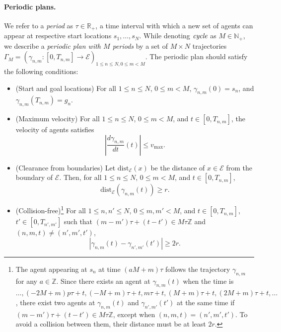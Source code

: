 \documentclass[letterpaper]{article} %
\begin{document}
\paragraph{Periodic plans.}
We refer to a \emph{period} as $\tau\in\mathbb{R}_+$, a time interval with which a new set of agents can appear at respective start locations $s_1,\dots,s_N$. While denoting $\emph{cycle}$ as $M\in\mathbb{N}_+$, we describe a \emph{periodic plan with $M$ periods} by a set of $M\times N$ trajectories $\Gamma_M=(\gamma_{n,m}: [0, T_{n,m}] \rightarrow \mathcal{E})_{1\leq n \leq N, 0\leq m < M}$. The periodic plan should satisfy the following conditions:
\begin{itemize}
\item (Start and goal locations) For all $1\leq n\leq N$, $0\leq m < M$,
 $\gamma_{n,m}(0) = s_n$, and $\gamma_{n,m}(T_{n,m}) = g_n$.
\item (Maximum velocity) For all $1\leq n\leq N$, $0\leq m<M$, and $t\in [0, T_{n,m}]$, the velocity of agents satisfies
\begin{equation}
    \left|\frac{d\gamma_{n,m}}{dt}(t)\right| \leq v_{\mathrm{max}}.
    \label{eq:vel}
\end{equation}
\item (Clearance from boundaries) Let $\mathrm{dist}_{\mathcal{E}}(x)$ be the distance of $x\in \mathcal{E}$ from the boundary of $\mathcal{E}$.
Then, for all $1\leq n\leq N$, $0\leq m<M$, and $t\in [0, T_{n,m}]$,
\begin{equation}
\mathrm{dist}_{\mathcal{E}}(\gamma_{n,m}(t))\geq r.
    \label{eq:obs}
\end{equation}
\item (Collision-free)\footnote{The agent appearing at $s_n$ at time $(aM+m)\tau$ follows the trajectory $\gamma_{n,m}$ for any $a\in\mathbb{Z}$. Since there exists an agent at $\gamma_{n,m}(t)$ when the time is $\ldots, (-2M+m)p\tau + t, (-M+m)\tau + t, m\tau + t, (M+m)\tau+t,(2M+m)\tau + t,\ldots$, there exist two agents at $\gamma_{n,m}(t)$ and $\gamma_{n',m'}(t')$ at the same time if $(m-m')\tau+(t-t')\in M\tau\mathbb{Z}$, except when $(n,m,t)=(n',m',t')$. To avoid a collision between them, their distance must be at least $2r$.}
For all $1\leq n, n'\leq N$, $0\leq m, m'<M$, and $t\in [0, T_{n,m}]$, $t'\in [0, T_{n',m'}]$ such that $(m-m')\tau+(t-t')\in M\tau\mathbb{Z}$ and $(n,m,t)\neq (n',m', t')$,
\begin{equation}\label{eq:collision-free}
\left|\gamma_{n,m}(t)-\gamma_{n',m'}(t')\right|\geq 2r.
\end{equation}
\end{itemize}
\end{document}
